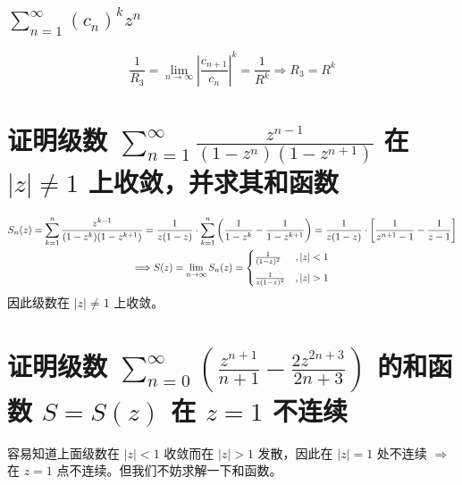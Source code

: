 \documentclass[UTF8]{report}
\theoremstyle{MyLineTheoremStyle} %
\theoremstyle{MyBlockTheoremStyle} %
\theoremstyle{MySubsubsectionStyle} %
\begin{document}
\subsection{$\displaystyle \sum_{n=1}^{\infty} (c_n)^k z^n$}
\noindent
\begin{equation}
\frac{1}{R_3}
= \lim_{n \to \infty} \left| \frac{c_{n+1}}{c_n} \right|^k
= \frac{1}{R^k} \Longrightarrow R_3 = R^k
\end{equation}

\section{证明级数 $\sum_{n=1}^{\infty} \frac{z^{n-1}}{(1 - z^n)(1 - z^{n+1})}$ 在 $ | z | \ne 1$ 上收敛，并求其和函数}
\begin{gather*}
    S_n(z) 
    = \sum_{k=1}^{n} \frac{z^{k-1}}{(1 - z^k)(1 - z^{k+1})} 
    = \frac{1}{z(1 - z)} \cdot \sum_{k=1}^{n} \left( \frac{1}{1 - z^k} - \frac{1}{1 - z^{k+1}} \right) 
    = \frac{1}{z(1 - z)} \cdot \left[ \frac{1}{z^{n+1} - 1} - \frac{1}{z - 1} \right]
    \\ 
    \Longrightarrow 
    S(z) = \lim_{n \to \infty}S_n(z) = 
    \begin{cases}
        \frac{1}{(1 - z)^2} &, | z | < 1 \vspace*{2mm} \\ 
        \frac{1}{z(1 - z)^2} &, | z | > 1
    \end{cases}
\end{gather*}
因此级数在 $ | z | \ne 1$ 上收敛。


\section{证明级数 $\sum_{n=0}^{\infty} \left( \frac{z^{n+1}}{n+1} - \frac{2z^{2n+3}}{2n+3} \right)$ 的和函数 $S = S(z)$ 在 $z = 1$ 不连续}
容易知道上面级数在 $| z | < 1$ 收敛而在 $| z | > 1$ 发散，因此在 $| z | = 1$ 处不连续 $\Longrightarrow $ 在 $z = 1$ 点不连续。但我们不妨求解一下和函数。
\end{document}

